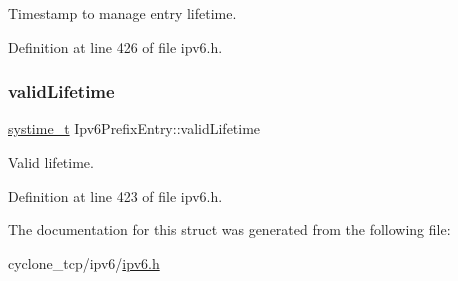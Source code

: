 Timestamp to manage entry lifetime. 



Definition at line 426 of file ipv6.\+h.

\mbox{\label{structIpv6PrefixEntry_aa60a2863be803fd4a40d40443ecb96f8}} 
\subsubsection{\texorpdfstring{valid\+Lifetime}{validLifetime}}
{\footnotesize\ttfamily \hyperlink{compiler__port_8h_ae3e32a98d431a02106616da3071832dd}{systime\+\_\+t} Ipv6\+Prefix\+Entry\+::valid\+Lifetime}



Valid lifetime. 



Definition at line 423 of file ipv6.\+h.



The documentation for this struct was generated from the following file\+:\begin{DoxyCompactItemize}
\item 
cyclone\+\_\+tcp/ipv6/\hyperlink{ipv6_8h}{ipv6.\+h}\end{DoxyCompactItemize}
